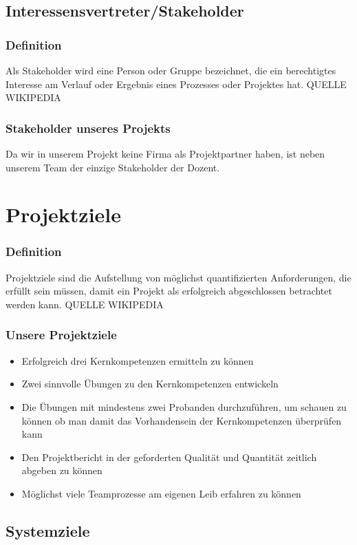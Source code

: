 \subsection{Interessensvertreter/Stakeholder}
\subsubsection{Definition}
Als Stakeholder wird eine Person oder Gruppe bezeichnet, die ein berechtigtes Interesse am Verlauf oder Ergebnis eines Prozesses oder Projektes hat. QUELLE WIKIPEDIA

\subsubsection{Stakeholder unseres Projekts}
Da wir in unserem Projekt keine Firma als Projektpartner haben, ist neben unserem Team der einzige Stakeholder der Dozent. 

\section{Projektziele}
\subsubsection{Definition}
Projektziele sind die Aufstellung von möglichst quantifizierten Anforderungen, die erfüllt sein müssen, damit ein Projekt als erfolgreich abgeschlossen betrachtet werden kann. QUELLE WIKIPEDIA

\subsubsection{Unsere Projektziele}
\begin{itemize}
\item Erfolgreich drei Kernkompetenzen ermitteln zu können
\item Zwei sinnvolle Übungen zu den Kernkompetenzen entwickeln
\item Die Übungen mit mindestens zwei Probanden durchzuführen, um schauen zu können ob man damit das Vorhandensein der Kernkompetenzen überprüfen kann
\item Den Projektbericht in der geforderten Qualität und Quantität zeitlich abgeben zu können
\item Möglichst viele Teamprozesse am eigenen Leib erfahren zu können
\end{itemize} 

\subsection{Systemziele}
